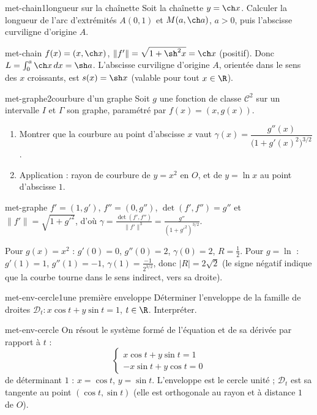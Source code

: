 \begin{exo}{met-chain}{1}{longueur sur la chaînette}
Soit la chaînette $y=\ch x$. Calculer la longueur de l'arc d'extrémités $A(0,1)$ et $M(a,\ch a)$, $a>0$, puis l'abscisse curviligne d'origine $A$.
\end{exo}

\begin{corrige}{met-chain}
$f(x)=(x,\ch x)$, $\|f'\|=\sqrt{1+\sh^2x}=\ch x$ (positif). Donc $L=\int_0^a\ch x\,dx=\sh a$. L'abscisse curviligne d'origine $A$, orientée dans le sens des $x$ croissants, est $s(x)=\sh x$ (valable pour tout $x\in\R$).
\end{corrige}

\begin{exo}{met-graphe}{2}{courbure d'un graphe}
Soit $g$ une fonction de classe $\mathcal C^2$ sur un intervalle $I$ et $\Gamma$ son graphe, paramétré par $f(x)=(x,g(x))$.
\begin{enumerate}
\item Montrer que la courbure au point d'abscisse $x$ vaut $\gamma(x)=\dfrac{g''(x)}{\big(1+g'(x)^2\big)^{3/2}}$.
\item Application : rayon de courbure de $y=x^2$ en $O$, et de $y=\ln x$ au point d'abscisse $1$.
\end{enumerate}
\end{exo}

\begin{corrige}{met-graphe}
 $f'=(1,g')$, $f''=(0,g'')$, $\det(f',f'')=g''$ et $\|f'\|=\sqrt{1+g'^2}$, d'où $\gamma=\frac{\det(f',f'')}{\|f'\|^3}=\frac{g''}{(1+g'^2)^{3/2}}$.

 Pour $g(x)=x^2$ : $g'(0)=0$, $g''(0)=2$, $\gamma(0)=2$, $R=\frac12$. Pour $g=\ln$ : $g'(1)=1$, $g''(1)=-1$, $\gamma(1)=\frac{-1}{2^{3/2}}$, donc $|R|=2\sqrt2$ (le signe négatif indique que la courbe tourne dans le sens indirect, vers sa droite).
\end{corrige}

\begin{exo}{met-env-cercle}{1}{une première enveloppe}
Déterminer l'enveloppe de la famille de droites $\mathcal D_t:x\cos t+y\sin t=1$, $t\in\R$. Interpréter.
\end{exo}

\begin{corrige}{met-env-cercle}
On résout le système formé de l'équation et de sa dérivée par rapport à $t$ :
\[\begin{cases}x\cos t+y\sin t=1\\-x\sin t+y\cos t=0\end{cases}\]
de déterminant $1$ : $x=\cos t$, $y=\sin t$. L'enveloppe est le cercle unité ; $\mathcal D_t$ est sa tangente au point $(\cos t,\sin t)$ (elle est orthogonale au rayon et à distance $1$ de $O$).
\end{corrige}

